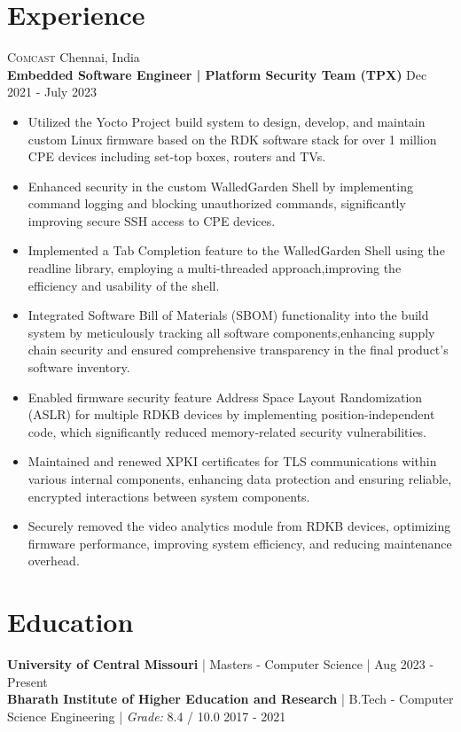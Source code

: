 \documentclass[10pt, letterpaper]{article}
\newcommand{\cmpnysection}[4] {
	\raggedright{\large\scshape{#1}}
	\hfill {#2} \\
	{\bfseries{#3}}
	\hfill {#4}
}
\newcommand{\edusection}[4] {
	\textbf{#1} | {#3} | {#4}
	\hfill {#2} \\
}
\begin{document}
\section{Experience}
\cmpnysection
{Comcast}
{Chennai, India}
{Embedded Software Engineer | Platform Security Team (TPX)}
{Dec 2021 - July 2023}
\vspace*{-0.5em}
\begin{itemize}[leftmargin=6mm]
	\setlength\itemsep{0em}
	\item{Utilized the Yocto Project build system to design, develop, and maintain custom Linux firmware based on the RDK software stack for over 1 million CPE devices including set-top boxes, routers and TVs.}
	\item{Enhanced security in the custom WalledGarden Shell by implementing command logging and blocking unauthorized commands, significantly improving secure SSH access to CPE devices.}
	\item{Implemented a Tab Completion feature to the WalledGarden Shell using the readline library, employing a multi-threaded approach,improving the efficiency and usability of the shell.}
	\item{Integrated Software Bill of Materials (SBOM) functionality into the build system by meticulously tracking all software components,enhancing supply chain security and ensured comprehensive transparency in the final product's software inventory.}
	\item{Enabled firmware security feature Address Space Layout Randomization (ASLR) for multiple RDKB devices by implementing position-independent code, which significantly reduced memory-related security vulnerabilities.}
	\item{Maintained and renewed XPKI certificates for TLS communications within various internal components, enhancing data protection and ensuring reliable, encrypted interactions between system components.}
	\item{Securely removed the video analytics module from RDKB devices, optimizing firmware performance, improving system efficiency, and reducing maintenance overhead.}
\end{itemize}

\section{Education}
\edusection
{University of Central Missouri}
{Aug 2023 {-} Present}
{Masters {-} Computer Science}
{}

\edusection
{Bharath Institute of Higher Education and Research}
{2017 {-} 2021}
{B.Tech {-} Computer Science Engineering}
{\textit{Grade:} 8.4 / 10.0}
\end{document}
